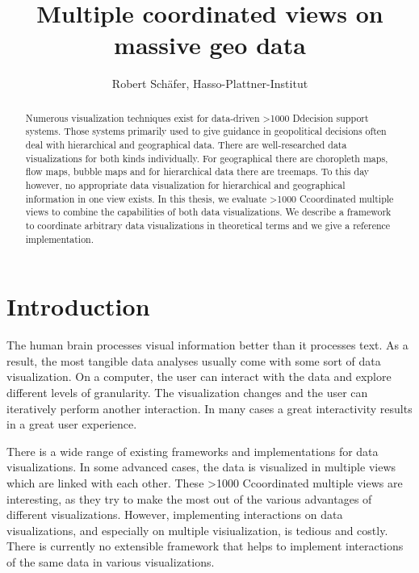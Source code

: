\documentclass{article}
\newcommand\hmm[1]{\ifnum\ifhmode\spacefactor\else2000\fi>1000 \uppercase{#1}\else#1\fi}
\newcommand{\cmvs}{\hmm{c}oordinated multiple views}
\newcommand{\dss}{\hmm{d}ecision support systems}
\begin{document}
\title{Multiple coordinated views on massive geo data}
\author{Robert Schäfer, Hasso-Plattner-Institut}
\maketitle
\clearpage

\tableofcontents
\clearpage



\begin{abstract}
  Numerous visualization techniques exist for data-driven \dss{}.
  Those systems primarily used to give guidance in geopolitical decisions often deal with hierarchical and geographical data.
  There are well-researched data visualizations for both kinds individually.
  For geographical there are choropleth maps, flow maps, bubble maps and for hierarchical data there are treemaps.
  To this day however, no appropriate data visualization for hierarchical and geographical information in one view exists.
  In this thesis, we evaluate \cmvs{} to combine the capabilities of both data visualizations.
  We describe a framework to coordinate arbitrary data visualizations in theoretical terms and we give a reference implementation.

\end{abstract}
\clearpage

\section{Introduction}
The human brain processes visual information better than it processes text.
As a result, the most tangible data analyses usually come with some sort of data visualization.
On a computer, the user can interact with the data and explore different levels of granularity.
The visualization changes and the user can iteratively perform another interaction.
In many cases a great interactivity results in a great user experience.

There is a wide range of existing frameworks and implementations for data visualizations.
In some advanced cases, the data is visualized in multiple views which are linked with each other.
These \cmvs{} are interesting, as they try to make the most out of the various advantages of different visualizations.
However, implementing interactions on data visualizations, and especially on multiple visiualization, is tedious and costly.
There is currently no extensible framework that helps to implement interactions of the same data in various visualizations.
\end{document}
